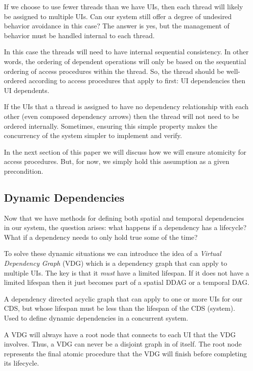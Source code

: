 If we choose to use fewer threads than we have UIs, then each thread will likely be assigned to multiple UIs. Can our system still offer a degree of undesired behavior avoidance in this case? The answer is yes, but the management of behavior must be handled internal to each thread.

In this case the threads will need to have internal sequential consistency. In other words, the ordering of dependent operations will only be based on the sequential ordering of access procedures within the thread. So, the thread should be well-ordered according to access procedures that apply to first: UI dependencies then UI dependents.

If the UIs that a thread is assigned to have no dependency relationship with each other (even composed dependency arrows) then the thread will not need to be ordered internally. Sometimes, ensuring this simple property makes the concurrency of the system simpler to implement and verify.

In the next section of this paper we will discuss how we will ensure atomicity for access procedures. But, for now, we simply hold this assumption as a given precondition.

\subsection{Dynamic Dependencies}

Now that we have methods for defining both spatial and temporal dependencies in our system, the question arises: what happens if a dependency has a lifecycle? What if a dependency needs to only hold true some of the time?

To solve these dynamic situations we can introduce the idea of a \textit{Virtual Dependency Graph} (VDG) which is a dependency graph that can apply to multiple UIs. The key is that it \textit{must} have a limited lifespan. If it does not have a limited lifespan then it just becomes part of a spatial DDAG or a temporal DAG.

\begin{con-def}
	\label{vdg}
	A dependency directed acyclic graph that can apply to one or more UIs for our CDS, but whose lifespan must be less than the lifespan of the CDS (system). Used to define dynamic dependencies in a concurrent system.
\end{con-def}

A VDG will always have a root node that connects to each UI that the VDG involves. Thus, a VDG can never be a disjoint graph in of itself. The root node represents the final atomic procedure that the VDG will finish before completing its lifecycle.

